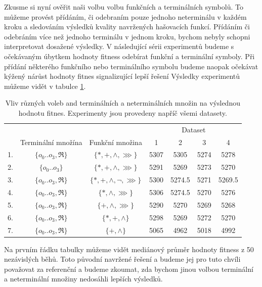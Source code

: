
Zkusme si nyní ověřit naši volbu volbu funkčních a terminálních symbolů. To můžeme provést přídáním, či odebraním 
pouze jednoho neterminálu v každém kroku a sledováním výsledků kvality navržených hašovacích funkcí. Přídáním či
odebráním více než jednoho terminálu v jednom kroku, bychom nebyly schopni interpretovat dosažené výsledky. V 
následující sérii experimentů budeme s očekávaným úbytkem hodnoty fitness odebírat funkční a terminální symboly.
Při přídání některého funkčního nebo terminálního symbolu budeme naopak očekávat kýžený nárůst hodnoty fitnes 
signalizující lepší řešení Výsledky experimentů můžeme vidět v tabulce \ref{tab:basicRunAlternatives1}.

\begin{table}[h]
	\centering
	\caption{Vliv různých voleb and terminálních a neterminálních množin na výslednou hodnotu fitnes. Experimenty jsou provedeny
		napříč všemi datasety.}
	\begin{tabular}{lcccccc} \\ \hline
		   & & & \multicolumn{4}{c}{Dataset} \\
		   & Terminální množína & Funkční množina & 1 & 2 & 3 & 4 \\ \hline
		1. & $\{o_{0} .. o_{3}, \Re \}$ & $\{*, +, \wedge, \ggg\}$         & 5307 & 5305     & 5274 & 5278 \\
		2. & $\{o_{0} .. o_{3}\}$ & $\{*, +, \wedge, \ggg\}$                  & 5291 & 5269    & 5273 & 5270  \\
		3. & $\{o_{0} .. o_{3}, \Re \}$ & $\{*, +, \wedge, \neg, \ggg\}$ & 5300 & 5274.5 & 5271 &  5269.5 \\
		4. & $\{o_{0} .. o_{3}, \Re \}$ & $\{*, \wedge, \ggg\}$              & 5306 & 5274.5 & 5270 & 5276 \\
		5. & $\{o_{0} .. o_{3}, \Re \}$ & $\{+, \wedge, \ggg\}$ 			   & 5290 & 5270    & 5269  & 5268 \\
		6. & $\{o_{0} .. o_{3}, \Re \}$ & $\{*, +, \wedge\}$                   & 5298 & 5269    & 5272 & 5270 \\
		7. & $\{o_{0} .. o_{3}, \Re \}$ & $\{+, \wedge\}$                      & 5065 & 4962     & 5018 & 4992 \\
		\hline
	\end{tabular}
	\label{tab:basicRunAlternatives1}
\end{table}

Na prvním řádku tabulky můžeme vidět mediánový průměr hodnoty fitness z 50 nezávislých běhů. Toto původní
navržené řešení a budeme jej pro tuto chvíli považovat za referenční a budeme zkoumat, zda bychom jinou
volbou terminální a neterminální množiny nedosáhli lepších výsledků. 

